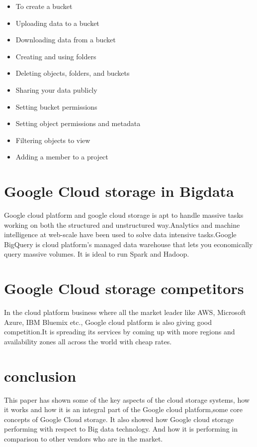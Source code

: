 \documentclass[9pt,twocolumn,twoside]{../../styles/osajnl}
\begin{document}
\begin{itemize}


\item To create a bucket
\item Uploading data to a bucket
\item Downloading data from a bucket
\item Creating and using folders
\item Deleting objects, folders, and buckets
\item Sharing your data publicly
\item Setting bucket permissions
\item Setting object permissions and metadata
\item Filtering objects to view
\item Adding a member to a project

\end{itemize} 

\section{Google Cloud storage in Bigdata}

Google cloud platform and google cloud storage is apt to handle massive tasks working on both the structured and unstructured way.Analytics and machine intelligence at web-scale have been used to solve data intensive tasks.Google BigQuery \cite{www-google-bigquery} is cloud platform's  managed data warehouse that lets you economically query massive volumes. It is ideal to run Spark and Hadoop.

\section{Google Cloud storage competitors}
In the cloud platform business where all the market leader like AWS, Microsoft Azure, IBM Bluemix etc., Google cloud platform is also giving good competition.It is spreading its services by coming up with more regions and availability zones all across the world with cheap rates. 

\section{conclusion}
This paper has shown some of the key aspects of the cloud storage systems, how it works and how it is an integral part of the Google cloud platform,some core concepts of Google Cloud storage. It also showed how Google cloud storage performing with respect to Big data technology. And how it is performing in comparison to other vendors who are in the market.


\end{document}
